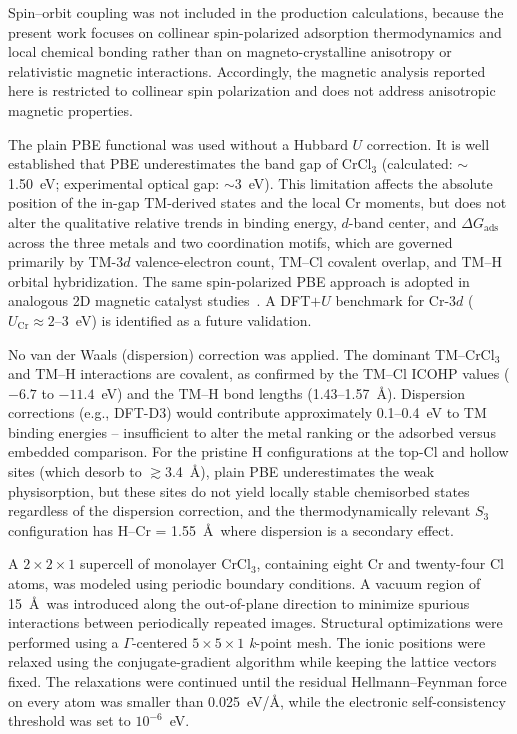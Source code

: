 \documentclass[journal=jacsat,manuscript=article]{achemso}
\begin{document}
Spin--orbit coupling was not included in the production calculations, because the present work focuses on collinear spin-polarized adsorption thermodynamics and local chemical bonding rather than on magneto-crystalline anisotropy or relativistic magnetic interactions. Accordingly, the magnetic analysis reported here is restricted to collinear spin polarization and does not address anisotropic magnetic
properties.

The plain PBE functional was used without a Hubbard $U$ correction. It is well established that PBE underestimates the band gap of CrCl$_3$ (calculated: $\sim$1.50~eV; experimental optical gap: $\sim$3~eV). This limitation affects the absolute position of the in-gap TM-derived states and the local Cr moments, but does not alter the qualitative relative trends in binding energy, $d$-band center, and $\Delta G_{\mathrm{ads}}$ across the three metals and two coordination motifs, which are governed primarily by TM-$3d$ valence-electron count, TM--Cl covalent overlap, and TM--H orbital hybridization. The same spin-polarized PBE approach is adopted in analogous 2D magnetic catalyst studies~\cite{Zala2024,Ipaves2025,Liao2022}. A DFT$+U$ benchmark for Cr-$3d$ ($U_{\mathrm{Cr}} \approx 2$--3~eV) is identified as a future validation.

No van der Waals (dispersion) correction was applied. The dominant TM--CrCl$_3$ and TM--H interactions are covalent, as confirmed by the TM--Cl ICOHP values ($-6.7$ to $-11.4$~eV) and the TM--H bond lengths (1.43--1.57~\AA). Dispersion corrections (e.g., DFT-D3) would contribute approximately 0.1--0.4~eV to TM binding energies -- insufficient to alter the metal ranking or the adsorbed versus embedded comparison. For the pristine H configurations at the top-Cl and hollow sites (which desorb to $\gtrsim$3.4~\AA), plain PBE underestimates the weak physisorption, but these sites do not yield locally stable chemisorbed states regardless of the dispersion correction, and the thermodynamically relevant $S_3$ configuration has H--Cr = 1.55~\AA\ where dispersion is a secondary effect.

A $2 \times 2 \times 1$ supercell of monolayer CrCl$_3$, containing eight Cr and twenty-four Cl atoms, was modeled using periodic boundary conditions. A vacuum region of 15~\AA\ was introduced along the out-of-plane direction to minimize spurious interactions between periodically repeated images. Structural optimizations were performed using a $\Gamma$-centered $5 \times 5 \times 1$ \textit{k}-point mesh. The ionic positions were relaxed using the conjugate-gradient algorithm while keeping the lattice vectors fixed. The relaxations were continued until the residual Hellmann--Feynman force on every atom was smaller than 0.025~eV/\AA, while the electronic self-consistency threshold was set to $10^{-6}$~eV.
\end{document}
